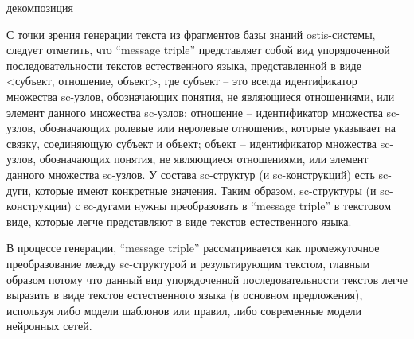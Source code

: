 \begin{SCn}
	\begin{scnrelfromset}{декомпозиция}
	\end{scnrelfromset}
\end{SCn}

С точки зрения генерации текста из фрагментов базы знаний ostis-системы, следует отметить, что ``message triple'' представляет собой вид упорядоченной последовательности текстов естественного языка, представленной в виде <субъект, отношение, объект>, где субъект -- это всегда идентификатор множества sc-узлов, обозначающих понятия, не являющиеся отношениями, или элемент данного множества sc-узлов; отношение -- идентификатор множества sc-узлов, обозначающих ролевые или неролевые отношения, которые указывает на связку, соединяющую субъект и объект; объект -- идентификатор множества sc-узлов, обозначающих понятия, не являющиеся отношениями, или элемент данного множества sc-узлов. У состава sc-структур (и sc-конструкций) есть sc-дуги, которые имеют конкретные значения. Таким образом, sc-структуры (и sc-конструкции) с sc-дугами нужны преобразовать в ``message triple'' в текстовом виде, которые легче представляют в виде текстов естественного языка.

В процессе генерации, ``message triple'' рассматривается как промежуточное преобразование между sc-структурой и результирующим текстом, главным образом потому что данный вид упорядоченной последовательности текстов легче выразить в виде текстов естественного языка (в основном предложения), используя либо модели шаблонов или правил, либо современные модели нейронных сетей. 

